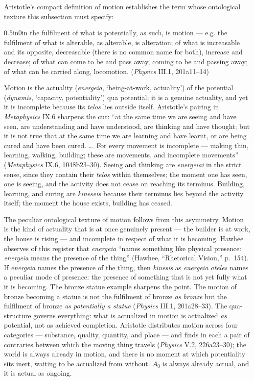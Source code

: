 Aristotle's compact definition of motion establishes the term whose ontological texture this subsection must specify:
\begin{adjustwidth}{0.5in}{0in}
the fulfilment of what is potentially, as such, is motion --- e.g. the fulfilment of what is alterable, as alterable, is alteration; of what is increasable and its opposite, decreasable (there is no common name for both), increase and decrease; of what can come to be and pass away, coming to be and passing away; of what can be carried along, locomotion. (\textit{Physics} III.1, 201a11--14)
\end{adjustwidth}
Motion is the actuality (\textit{energeia},  `being-at-work, actuality') of the potential (\textit{dynamis},  `capacity, potentiality') qua potential; it is a genuine actuality, and yet it is incomplete because its \textit{telos} lies outside itself. Aristotle's pairing in \textit{Metaphysics} IX.6 sharpens the cut: ``at the same time we are seeing and have seen, are understanding and have understood, are thinking and have thought; but it is not true that at the same time we are learning and have learnt, or are being cured and have been cured. \ldots\ For every movement is incomplete --- making thin, learning, walking, building; these are movements, and incomplete movements'' (\textit{Metaphysics} IX.6, 1048b23--30). Seeing and thinking are \textit{energeiai} in the strict sense, since they contain their \textit{telos} within themselves; the moment one has seen, one is seeing, and the activity does not cease on reaching its terminus. Building, learning, and curing are \textit{kinēseis} because their terminus lies beyond the activity itself; the moment the house exists, building has ceased.

The peculiar ontological texture of motion follows from this asymmetry. Motion is the kind of actuality that is at once genuinely present --- the builder is at work, the house is rising --- and incomplete in respect of what it is becoming. Hawhee observes of this register that \textit{energeia} ``names something like physical presence: \textit{energeia} means the presence of the thing'' (Hawhee, ``Rhetorical Vision,'' p.~154). If \textit{energeia} names the presence of the thing, then \textit{kinēsis} as \textit{energeia ateles} names a peculiar mode of presence: the presence of something that is not yet fully what it is becoming. The bronze statue example sharpens the point. The motion of bronze becoming a statue is not the fulfilment of bronze \textit{as bronze} but the fulfilment of bronze \textit{as potentially a statue} (\textit{Physics} III.1, 201a28--33). The qua-structure governs everything: what is actualized in motion is actualized \textit{as} potential, not as achieved completion. Aristotle distributes motion across four categories --- substance, quality, quantity, and place --- and finds in each a pair of contraries between which the moving thing travels (\textit{Physics} V.2, 226a23--30); the world is always already in motion, and there is no moment at which potentiality sits inert, waiting to be actualized from without. $A_0$ is always already actual, and it is actual as ongoing.

